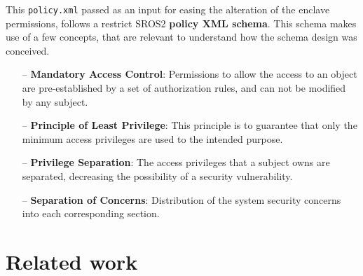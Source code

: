 This \texttt{policy.xml} passed as an input for easing the alteration of the enclave permissions, follows a restrict SROS2 \textbf{policy XML schema}. This schema makes use of a few concepts, that are relevant to understand how the schema design was conceived.

\begin{itemize}
    \item[--] \textbf{Mandatory Access Control}: Permissions to allow the access to an object are pre-established by a set of authorization rules, and can not be modified by any subject.  
    \item[--] \textbf{Principle of Least Privilege}: This principle is to guarantee that only the minimum access privileges are used to the intended purpose.
    \item[--] \textbf{Privilege Separation}: The access privileges that a subject owns are separated, decreasing the possibility of a security vulnerability.
    \item[--] \textbf{Separation of Concerns}: Distribution of the system security concerns into each corresponding section.  
\end{itemize}
                
                

\section{Related work}\label{s:relWork}
